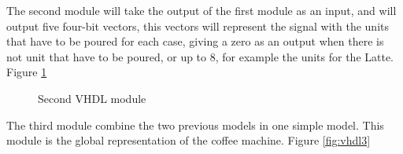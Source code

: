 \documentclass[12pt]{article}
\begin{document}
The second module will take the output of the first module as an input, and will output five four-bit vectors, this vectors will represent the signal with the units that have to be poured for each case, giving a zero as an output when there is not unit that have to be poured, or up to 8, for example the units for the Latte. Figure \ref{fig:vhdl2}

\begin{figure}[H]
\caption{Second VHDL module}
\label{fig:vhdl2}
\end{figure}

The third module combine the two previous models in one simple model. This module is the global representation of the coffee machine. Figure \ref{fig:vhdl3}
\end{document}
